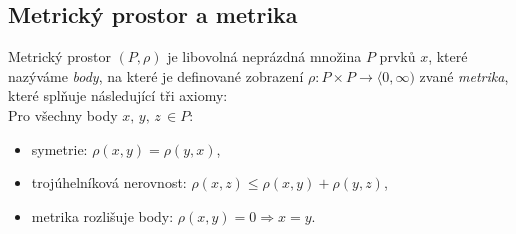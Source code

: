 \subsection{Metrický prostor a metrika}
\begin{definition}
Metrický prostor $(P,\rho)$ je libovolná neprázdná množina $P$ prvků $x$, které nazýváme \textit{body}, na které je definované zobrazení $\rho: P\times P\rightarrow \langle 0,\infty)$ zvané \textit{metrika}, které splňuje následující tři axiomy:\\
Pro všechny body $x,\,y,\,z\,\in P:$
\begin{itemize}
\item symetrie: $\rho (x,y)=\rho(y,x)$,
\item trojúhelníková nerovnost: $\rho(x,z)\leq\rho(x,y)+\rho(y,z)$,
\item metrika rozlišuje body: $\rho(x,y)=0 \Rightarrow x=y$. 
\end{itemize}
\end{definition}
